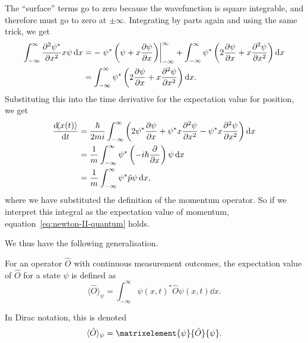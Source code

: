 \documentclass[../quantum_mechanics.tex]{subfiles}
\begin{document}
            The ``surface'' terms go to zero because the wavefunction is square integrable, and therefore must go to zero at $\pm\infty$.
            Integrating by parts again and using the same trick, we get
            \begin{align}
                \int_{-\infty}^\infty\pdv[2]{\psi^\ast}{x}x\psi\dd{x}&=-\left.\psi^\ast\left(\psi+x\pdv{\psi}{x}\right)\right|_{-\infty}^\infty+\int_{-\infty}^\infty\psi^\ast\left(2\pdv{\psi}{x}+x\pdv[2]{\psi}{x}\right)\dd{x}\\
                &=\int_{-\infty}^\infty\psi^\ast\left(2\pdv{\psi}{x}+x\pdv[2]{\psi}{x}\right)\dd{x}.
            \end{align}
            Substituting this into the time derivative for the expectation value for position, we get
            \begin{align}
                \dv{\langle x(t)\rangle}{t}&=\frac{\hbar}{2mi}\int_{-\infty}^\infty\left(2\psi^\ast\pdv{\psi}{x}+\psi^\ast x\pdv[2]{\psi}{x}-\psi^\ast x\pdv[2]{\psi}{x}\right)\dd{x}\\
                &=\frac{1}{m}\int_{-\infty}^\infty\psi^\ast\left(-i\hbar\pdv{}{x}\right)\psi\dd{x}\\
                &=\frac{1}{m}\int_{-\infty}^\infty\psi^\ast\hat{p}\psi\dd{x},
            \end{align}
            where we have substituted the definition of the momentum operator.
            So if we interpret this integral as the expectation value of momentum, equation~\ref{eq:newton-II-quantum} holds.

            We thus have the following generalisation.
            \begin{definition}
                For an operator $\hat{O}$ with continuous measurement outcomes, the expectation value of $\hat{O}$ for a state $\psi$ is defined as
                \begin{equation}
                    \langle\hat{O}\rangle_\psi=\int_{-\infty}^\infty\psi(x,t)^\ast\hat{O}\psi(x,t)\dd{x}.
                \end{equation}

                In Dirac notation, this is denoted
                \begin{equation}
                    \langle\hat{O}\rangle_\psi=\matrixelement{\psi}{\hat{O}}{\psi}.
                \end{equation}
            \end{definition}
\end{document}
